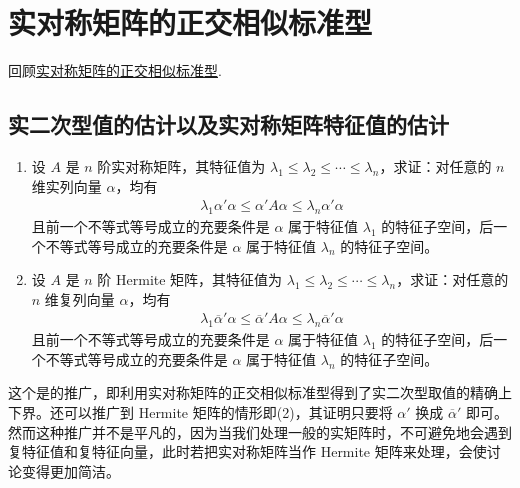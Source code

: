 \documentclass[../../main.tex]{subfiles}
\begin{document}
\section{实对称矩阵的正交相似标准型}

回顾\hyperref[theorem:实对称和Hermite矩阵的正交对角化]{实对称矩阵的正交相似标准型}.

\subsection{实二次型值的估计以及实对称矩阵特征值的估计}

\begin{proposition}\label{proposition:例9.52}
\begin{enumerate}[(1)]
\item 设 \(A\) 是 \(n\) 阶实对称矩阵，其特征值为 \(\lambda_1 \leqslant  \lambda_2 \leqslant  \cdots \leqslant  \lambda_n\)，求证：对任意的 \(n\) 维实列向量 \(\alpha\)，均有
\begin{align*}
\lambda_1\alpha'\alpha \leqslant  \alpha'A\alpha \leqslant  \lambda_n\alpha'\alpha
\end{align*}
且前一个不等式等号成立的充要条件是 \(\alpha\) 属于特征值 \(\lambda_1\) 的特征子空间，后一个不等式等号成立的充要条件是 \(\alpha\) 属于特征值 \(\lambda_n\) 的特征子空间。

\item 设 \(A\) 是 \(n\) 阶 Hermite 矩阵，其特征值为 \(\lambda_1 \leqslant  \lambda_2 \leqslant  \cdots \leqslant  \lambda_n\)，求证：对任意的 \(n\) 维复列向量 \(\alpha\)，均有
\begin{align*}
\lambda_1\overline{\alpha}'\alpha \leqslant  \overline{\alpha}'A\alpha \leqslant  \lambda_n\overline{\alpha}'\alpha
\end{align*}
且前一个不等式等号成立的充要条件是 \(\alpha\) 属于特征值 \(\lambda_1\) 的特征子空间，后一个不等式等号成立的充要条件是 \(\alpha\) 属于特征值 \(\lambda_n\) 的特征子空间。
\end{enumerate}
\end{proposition}
\begin{remark}
这个是的推广，即利用实对称矩阵的正交相似标准型得到了实二次型取值的精确上下界。还可以推广到 Hermite 矩阵的情形即(2)，其证明只要将 \(\alpha'\) 换成 \(\overline{\alpha}'\) 即可。然而这种推广并不是平凡的，因为当我们处理一般的实矩阵时，不可避免地会遇到复特征值和复特征向量，此时若把实对称矩阵当作 Hermite 矩阵来处理，会使讨论变得更加简洁。
\end{remark}
\end{document}
